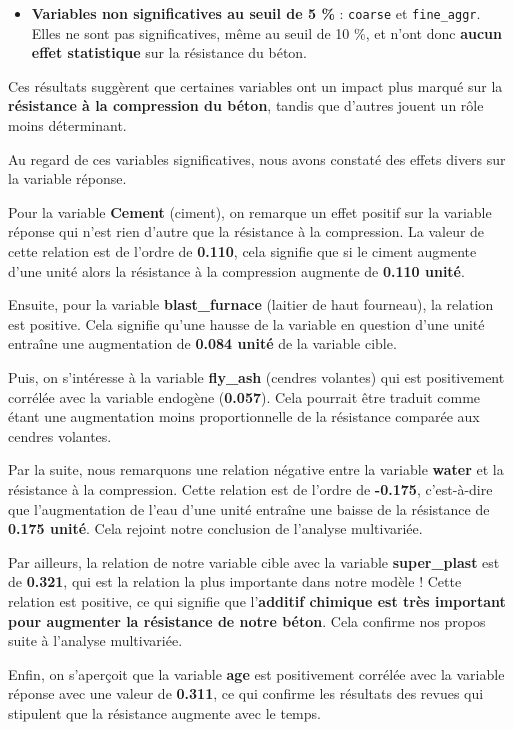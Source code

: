 \documentclass[
  12pt,
]{article}
\providecommand{\tightlist}{%
  \setlength{\itemsep}{0pt}\setlength{\parskip}{0pt}}
\begin{document}
\begin{itemize}
\tightlist
\item
  \textbf{Variables non significatives au seuil de 5 \%} :
  \texttt{coarse} et \texttt{fine\_aggr}. Elles ne sont pas
  significatives, même au seuil de 10 \%, et n'ont donc \textbf{aucun
  effet statistique} sur la résistance du béton.
\end{itemize}

Ces résultats suggèrent que certaines variables ont un impact plus
marqué sur la \textbf{résistance à la compression du béton}, tandis que
d'autres jouent un rôle moins déterminant.

Au regard de ces variables significatives, nous avons constaté des
effets divers sur la variable réponse.

Pour la variable \textbf{Cement} (ciment), on remarque un effet positif
sur la variable réponse qui n'est rien d'autre que la résistance à la
compression. La valeur de cette relation est de l'ordre de
\textbf{0.110}, cela signifie que si le ciment augmente d'une unité
alors la résistance à la compression augmente de \textbf{0.110 unité}.

Ensuite, pour la variable \textbf{blast\_furnace} (laitier de haut
fourneau), la relation est positive. Cela signifie qu'une hausse de la
variable en question d'une unité entraîne une augmentation de
\textbf{0.084 unité} de la variable cible.

Puis, on s'intéresse à la variable \textbf{fly\_ash} (cendres volantes)
qui est positivement corrélée avec la variable endogène
(\textbf{0.057}). Cela pourrait être traduit comme étant une
augmentation moins proportionnelle de la résistance comparée aux cendres
volantes.

Par la suite, nous remarquons une relation négative entre la variable
\textbf{water} et la résistance à la compression. Cette relation est de
l'ordre de \textbf{-0.175}, c'est-à-dire que l'augmentation de l'eau
d'une unité entraîne une baisse de la résistance de \textbf{0.175
unité}. Cela rejoint notre conclusion de l'analyse multivariée.

Par ailleurs, la relation de notre variable cible avec la variable
\textbf{super\_plast} est de \textbf{0.321}, qui est la relation la plus
importante dans notre modèle ! Cette relation est positive, ce qui
signifie que l'\textbf{additif chimique est très important pour
augmenter la résistance de notre béton}. Cela confirme nos propos suite
à l'analyse multivariée.

Enfin, on s'aperçoit que la variable \textbf{age} est positivement
corrélée avec la variable réponse avec une valeur de \textbf{0.311}, ce
qui confirme les résultats des revues qui stipulent que la résistance
augmente avec le temps.
\end{document}
